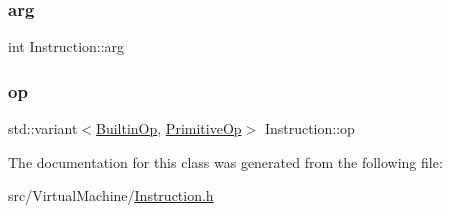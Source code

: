 \subsubsection{\texorpdfstring{arg}{arg}}
{\footnotesize\ttfamily int Instruction\+::arg}

\mbox{\label{class_instruction_ad6b1f252f404568d2fe80644a7caa224}} 
\subsubsection{\texorpdfstring{op}{op}}
{\footnotesize\ttfamily std\+::variant$<$\hyperlink{_instruction_8h_af2fb7c87c5854c5733d7bb0506b06de7}{Builtin\+Op}, \hyperlink{_instruction_8h_a227278394efd1e2313c727102db09ea9}{Primitive\+Op}$>$ Instruction\+::op}



The documentation for this class was generated from the following file\+:\begin{DoxyCompactItemize}
\item 
src/\+Virtual\+Machine/\hyperlink{_instruction_8h}{Instruction.\+h}\end{DoxyCompactItemize}
